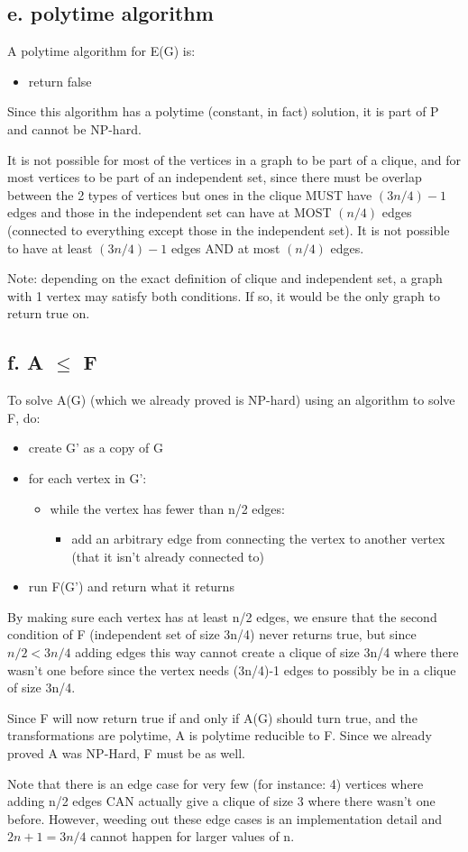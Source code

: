 \documentclass[a4paper]{article}
\begin{document}
\subsection{e. polytime algorithm}
A polytime algorithm for E(G) is:
\begin{itemize}
    \item return false
\end{itemize}

Since this algorithm has a polytime (constant, in fact) solution, it is part of P and cannot be NP-hard.

It is not possible for most of the vertices in a graph to be part of a clique, and for most vertices to be part of an independent set, since there must be overlap between the 2 types of vertices but ones in the clique MUST have $(3n/4) -1$ edges and those in the independent set can have at MOST $(n/4)$ edges (connected to everything except those in the independent set). It is not possible to have at least $(3n/4) -1$ edges AND at most $(n/4)$ edges.

Note: depending on the exact definition of clique and independent set, a graph with 1 vertex may satisfy both conditions. If so, it would be the only graph to return true on.

\subsection{f. A $\leq$ F}
To solve A(G) (which we already proved is NP-hard) using an algorithm to solve F, do:

\begin{itemize}
    \item create G' as a copy of G
    \item for each vertex in G':
    \begin{itemize}
        \item while the vertex has fewer than n/2 edges:
        \begin{itemize}
            \item add an arbitrary edge from connecting the vertex to another vertex (that it isn't already connected to)
        \end{itemize}
    \end{itemize}
    \item run F(G') and return what it returns
\end{itemize}

By making sure each vertex has at least n/2 edges, we ensure that the second condition of F (independent set of size 3n/4) never returns true, but since $n/2<3n/4$ adding edges this way cannot create a clique of size 3n/4 where there wasn't one before since the vertex needs (3n/4)-1 edges to possibly be in a clique of size 3n/4.

Since F will now return true if and only if A(G) should turn true, and the transformations are polytime, A is polytime reducible to F. Since we already proved A was NP-Hard, F must be as well.

Note that there is an edge case for very few (for instance: 4) vertices where adding n/2 edges CAN actually give a clique of size 3 where there wasn't one before. However, weeding out these edge cases is an implementation detail and $2n+1=3n/4$ cannot happen for larger values of n.
\end{document}

